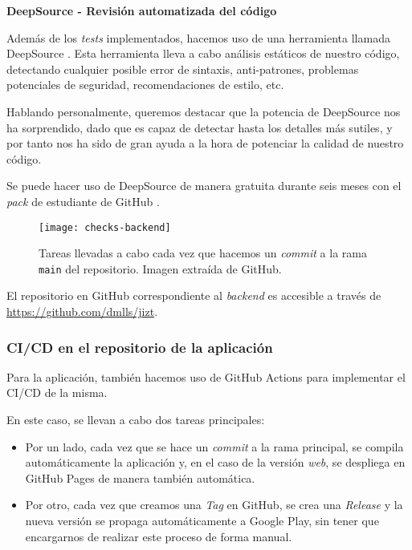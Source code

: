 \bigskip
\noindent
\textbf{DeepSource - Revisión automatizada del código}

Además de los \emph{tests} implementados, hacemos uso de una herramienta llamada DeepSource \cite{deepsource}. Esta herramienta lleva a cabo análisis estáticos de nuestro código, detectando cualquier posible error de sintaxis, anti-patrones, problemas potenciales de seguridad, recomendaciones de estilo, etc.

Hablando personalmente, queremos destacar que la potencia de DeepSource nos ha sorprendido, dado que es capaz de detectar hasta los detalles más sutiles, y por tanto nos ha sido de gran ayuda a la hora de potenciar la calidad de nuestro código.

Se puede hacer uso de DeepSource de manera gratuita durante seis meses con el \emph{pack} de estudiante de GitHub \cite{gh-student-pack}.

\begin{figure}[h!]
	\centering
	\texttt{[image: checks-backend]}
	\caption[GitHub Actions.]{Tareas llevadas a cabo cada vez que hacemos un \emph{commit} a la rama \texttt{main} del repositorio. Imagen extraída de GitHub.}
\end{figure}

El repositorio en GitHub correspondiente al \emph{backend} es accesible a través de \href{https://github.com/dmlls/jizt}{https://github.com/dmlls/jizt}.

\subsubsection{CI/CD en el repositorio de la aplicación}

Para la aplicación, también hacemos uso de GitHub Actions para implementar el CI/CD de la misma.

En este caso, se llevan a cabo dos tareas principales:

\vspace{-0.3cm}
\begin{itemize} [\textbullet]
	\item Por un lado, cada vez que se hace un \emph{commit} a la rama principal, se compila automáticamente la aplicación y, en el caso de la versión \emph{web}, se despliega en GitHub Pages de manera también automática.
	
	\item Por otro, cada vez que creamos una \emph{Tag} en GitHub, se crea una \emph{Release} y la nueva versión se propaga automáticamente a Google Play, sin tener que encargarnos de realizar este proceso de forma manual.
\end{itemize}

